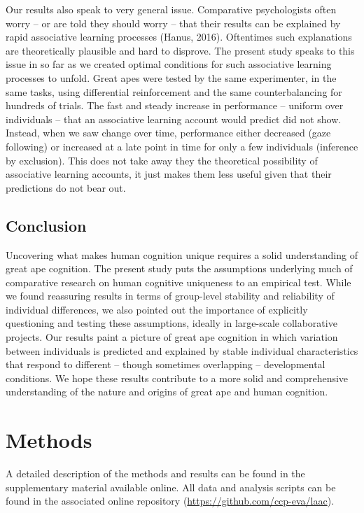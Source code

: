 \documentclass[
  man,floatsintext]{apa6}
\begin{document}
Our results also speak to very general issue. Comparative psychologists often worry -- or are told they should worry -- that their results can be explained by rapid associative learning processes (Hanus, 2016). Oftentimes such explanations are theoretically plausible and hard to disprove. The present study speaks to this issue in so far as we created optimal conditions for such associative learning processes to unfold. Great apes were tested by the same experimenter, in the same tasks, using differential reinforcement and the same counterbalancing for hundreds of trials. The fast and steady increase in performance -- uniform over individuals -- that an associative learning account would predict did not show. Instead, when we saw change over time, performance either decreased (gaze following) or increased at a late point in time for only a few individuals (inference by exclusion). This does not take away they the theoretical possibility of associative learning accounts, it just makes them less useful given that their predictions do not bear out.

\hypertarget{conclusion}{%
\subsection{Conclusion}\label{conclusion}}

Uncovering what makes human cognition unique requires a solid understanding of great ape cognition. The present study puts the assumptions underlying much of comparative research on human cognitive uniqueness to an empirical test. While we found reassuring results in terms of group-level stability and reliability of individual differences, we also pointed out the importance of explicitly questioning and testing these assumptions, ideally in large-scale collaborative projects. Our results paint a picture of great ape cognition in which variation between individuals is predicted and explained by stable individual characteristics that respond to different -- though sometimes overlapping -- developmental conditions. We hope these results contribute to a more solid and comprehensive understanding of the nature and origins of great ape and human cognition.

\hypertarget{methods}{%
\section{Methods}\label{methods}}

A detailed description of the methods and results can be found in the supplementary material available online. All data and analysis scripts can be found in the associated online repository (\url{https://github.com/ccp-eva/laac}).
\end{document}
